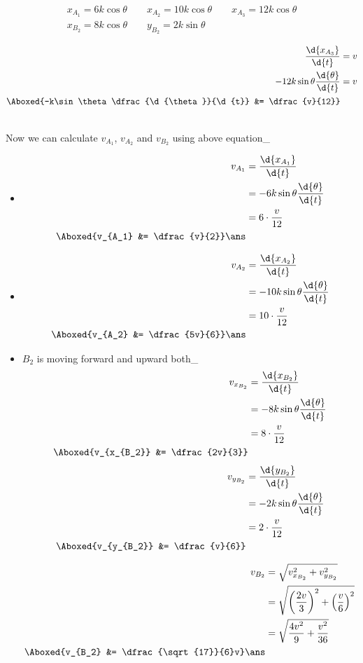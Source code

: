 \documentclass{article}
\begin{document}
\pagebreak
\begin{align*}
x_{A_1} = 6k \cos\theta \qquad  x_{A_2} = 10k \cos\theta \qquad x_{A_3} = 12k  \cos\theta \\ x_{B_2} = 8k \cos\theta \qquad y_{B_2} = 2k \sin\theta
\end{align*}

\begin{align*}
\dfrac{\d{x_{A_3}}}{\d{t}} &= v\\
-12k\sin\theta\dfrac{\d{\theta}}{\d{t}} &= v\\
\Aboxed{-k\sin\theta\dfrac{\d{\theta}}{\d{t}} &= \dfrac{v}{12}}\\[5mm]
\end{align*}
	
Now we can calculate $v_{A_1}$, $v_{A_2}$ and $v_{B_2}$ using above equation\_
\begin{itemize}
\item
\begin{align*}
v_{A_1} &= \dfrac{\d{x_{A_1}}}{\d{t}} \\
		&=-6k\sin\theta\dfrac{\d{\theta}}{\d{t}}\\
		&= 6 \cdot \dfrac{v}{12}\\
\Aboxed{v_{A_1} &= \dfrac{v}{2}}\ans
\end{align*}
\item
\begin{align*}
v_{A_2} &= \dfrac{\d{x_{A_2}}}{\d{t}} \\
		&=-10k\sin\theta\dfrac{\d{\theta}}{\d{t}}\\
		&= 10 \cdot \dfrac{v}{12}\\
\Aboxed{v_{A_2} &= \dfrac{5v}{6}}\ans 
\end{align*}
\item $B_2$ is moving forward and upward both\_
\begin{align*}
v_{x_{B_2}} &= \dfrac{\d{x_{B_2}}}{\d{t}} \\
		&=-8k\sin\theta\dfrac{\d{\theta}}{\d{t}}\\
		&= 8 \cdot \dfrac{v}{12}\\
\Aboxed{v_{x_{B_2}} &= \dfrac{2v}{3}}
\end{align*}
\begin{align*}
v_{y_{B_2}} &= \dfrac{\d{y_{B_2}}}{\d{t}} \\
		&=-2k\sin\theta\dfrac{\d{\theta}}{\d{t}}\\
		&= 2 \cdot \dfrac{v}{12}\\
\Aboxed{v_{y_{B_2}} &= \dfrac{v}{6}}
\end{align*}

\begin{align*}
v_{B_2} &= \sqrt{v_{x_{B_2}}^2 + v_{y_{B_2}}^2} \\
		&=\sqrt{\left(\dfrac{2v}{3}\right)^2 + \left(\dfrac{v}{6}\right)^2} \\
		&= \sqrt{\dfrac{4v^2}{9} + \dfrac{v^2}{36}}\\
\Aboxed{v_{B_2} &= \dfrac{\sqrt{17}}{6}v}\ans
\end{align*}

\end{itemize}
\end{document}
